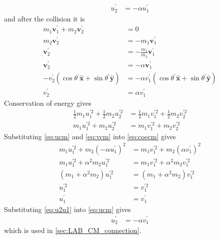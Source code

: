 \documentclass[twoside,english]{uiofysmaster/uiofysmaster}
\let\orgautoref\autoref
\renewcommand{\autoref}
        {%
		 \def\sectionautorefname{Section}%
		 \def\subsectionautorefname{Section}%
		 \def\subsubsectionautorefname{Section}%
		 \def\chapterautorefname{Chapter}%
          \orgautoref}
\begin{document}
\begin{appendices}
\begin{align}
	u_2^{'} &= - \alpha u_1^{'}
\end{align}
and after the collision it is
\begin{align}\label{eq:vcm}
	m_1 \boldsymbol{v}_1^{'} + m_2 \boldsymbol{v}_2^{'} &= 0  \nonumber\\
	m_2 \boldsymbol{v}_2^{'} &= -m_1 \boldsymbol{v}_1^{'} \nonumber\\
	\boldsymbol{v}_2^{'} &= - \frac{m_1}{m_2} \boldsymbol{v}_1^{'} \nonumber\\
	\boldsymbol{v}_2^{'} &= - \alpha \boldsymbol{v}_1^{'} \nonumber\\
	-v_2^{'} (\cos \theta^{'} \boldsymbol{\hat{x}} + \sin \theta^{'} \boldsymbol{\hat{y}}) &= - \alpha v_1^{'} (\cos \theta^{'} \boldsymbol{\hat{x}} + \sin \theta^{'} \boldsymbol{\hat{y}}) \nonumber\\
	v_2^{'} &= \alpha v_1^{'}
\end{align}
Conservation of energy gives
\begin{align}\label{eq:coecm}
	\tfrac{1}{2} m_1 u_1^{'2} + \tfrac{1}{2} m_2 u_2^{'2} &= \tfrac{1}{2} m_1 v_1^{'2} + \tfrac{1}{2} m_2 v_2^{'2} \nonumber\\
	m_1 u_1^{'2} + m_2 u_2^{'2} &= m_1 v_1^{'2} + m_2 v_2^{'2}
\end{align}
Substituting \autoref{eq:ucm} and \autoref{eq:vcm} into \autoref{eq:coecm} gives
\begin{align}\label{eq:u2u1}
	m_1 u_1^{'2} + m_2 (-\alpha u_1^{'})^2 &= m_1 v_1^{'2} + m_2 (\alpha v_1^{'})^2 \nonumber\\
	m_1 u_1^{'2} + \alpha^2 m_2 u_1^{'2} &= m_1 v_1^{'2} + \alpha^2 m_2 v_1^{'2} \nonumber\\
	(m_1 +\alpha^2 m_2) u_1^{'2} &= (m_1 +\alpha^2 m_2) v_1^{'2} \nonumber\\
	u_1^{'2} &= v_1^{'2} \nonumber\\
	u_1^{'} &= v_1^{'}
\end{align}
Substituting \autoref{eq:u2u1} into \autoref{eq:ucm} gives 
\begin{align}\label{eq:u2v1}
	u_2^{'} &= - \alpha v_1^{'}
\end{align}
which is used in \autoref{sec:LAB_CM_connection}.



\end{appendices}
\end{document}
